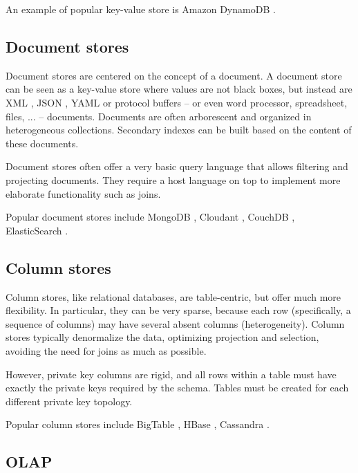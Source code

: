 \documentclass{acm_proc_article-sp}
\begin{document}
An example of popular key-value store is Amazon DynamoDB \cite{DeCandia2007}.

\subsection{Document stores}

Document stores are centered on the concept of a document. A document store can be seen as a key-value store where values are not black boxes, but instead are XML \cite{XML}, JSON \cite{JSON}, YAML \cite{YAML} or protocol buffers \cite{ProtocolBuffers} -- or even word processor, spreadsheet, files, ... -- documents. Documents are often arborescent and organized in heterogeneous collections. Secondary indexes can be built based on the content of these documents.

Document stores often offer a very basic query language that allows filtering and projecting documents. They require a host language on top to implement more elaborate functionality such as joins. 

Popular document stores include MongoDB \cite{MongoDB}, Cloudant \cite{Cloudant}, CouchDB \cite{CouchDB}, ElasticSearch \cite{ElasticSearch}.

\subsection{Column stores}

Column stores, like relational databases, are table-centric, but offer much more flexibility. In particular, they can be very sparse, because each row (specifically, a sequence of columns) may have several absent columns (heterogeneity). Column stores typically denormalize the data, optimizing projection and selection, avoiding the need for joins as much as possible.

However, private key columns are rigid, and all rows within a table must have exactly the private keys required by the schema. Tables must be created for each different private key topology.

Popular column stores include BigTable \cite{Chang2008}, HBase \cite{HBase}, Cassandra \cite{Lakshman2010}.

\subsection{OLAP}
\end{document}
